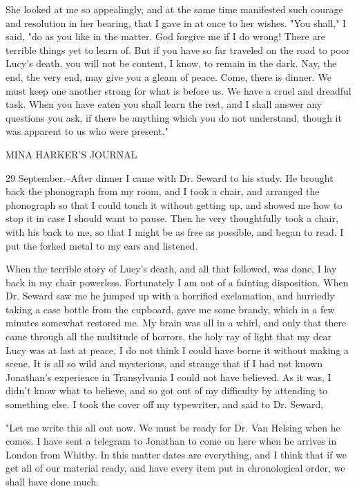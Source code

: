She looked at me so appealingly, and at the same time manifested such courage and resolution in her bearing, that I gave in at once to her wishes. "You shall," I said, "do as you like in the matter. God forgive me if I do wrong! There are terrible things yet to learn of. But if you have so far traveled on the road to poor Lucy's death, you will not be content, I know, to remain in the dark. Nay, the end, the very end, may give you a gleam of peace. Come, there is dinner. We must keep one another strong for what is before us. We have a cruel and dreadful task. When you have eaten you shall learn the rest, and I shall answer any questions you ask, if there be anything which you do not understand, though it was apparent to us who were present." 

MINA HARKER'S JOURNAL 

29 September.--After dinner I came with Dr. Seward to his study. He brought back the phonograph from my room, and I took a chair, and arranged the phonograph so that I could touch it without getting up, and showed me how to stop it in case I should want to pause. Then he very thoughtfully took a chair, with his back to me, so that I might be as free as possible, and began to read. I put the forked metal to my ears and listened. 

When the terrible story of Lucy's death, and all that followed, was done, I lay back in my chair powerless. Fortunately I am not of a fainting disposition. When Dr. Seward saw me he jumped up with a horrified exclamation, and hurriedly taking a case bottle from the cupboard, gave me some brandy, which in a few minutes somewhat restored me. My brain was all in a whirl, and only that there came through all the multitude of horrors, the holy ray of light that my dear Lucy was at last at peace, I do not think I could have borne it without making a scene. It is all so wild and mysterious, and strange that if I had not known Jonathan's experience in Transylvania I could not have believed. As it was, I didn't know what to believe, and so got out of my difficulty by attending to something else. I took the cover off my typewriter, and said to Dr. Seward, 

"Let me write this all out now. We must be ready for Dr. Van Helsing when he comes. I have sent a telegram to Jonathan to come on here when he arrives in London from Whitby. In this matter dates are everything, and I think that if we get all of our material ready, and have every item put in chronological order, we shall have done much. 

